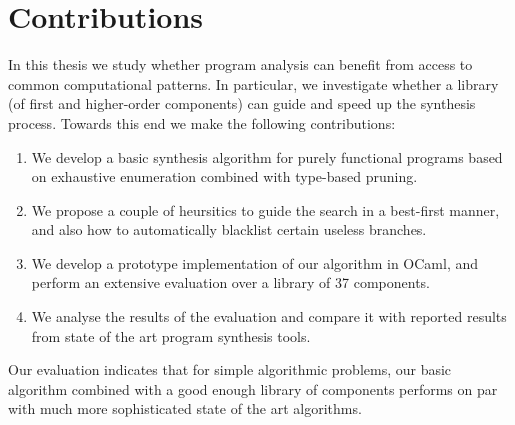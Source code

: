 \section{Contributions}
In this thesis we study whether program analysis can benefit from access to common computational patterns.  In particular, we investigate whether a library (of first and higher-order components) can guide and speed up the synthesis process.  Towards this end we make the following contributions:

\begin{enumerate}
\item We develop a basic synthesis algorithm for purely functional programs based on exhaustive enumeration combined with type-based pruning.

\item We propose a couple of heursitics to guide the search in a best-first manner, and also how to automatically blacklist certain useless branches.

\item We develop a prototype implementation of our algorithm in OCaml, and perform an extensive evaluation over a library of 37 components.

\item We analyse the results of the evaluation and compare it with reported results from state of the art program synthesis tools.
\end{enumerate}  

Our evaluation indicates that for simple algorithmic problems, our basic algorithm combined with a good enough library of components performs on par with much more sophisticated state of the art algorithms.








